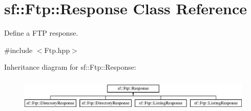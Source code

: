 \hypertarget{classsf_1_1_ftp_1_1_response}{\section{sf\-:\-:Ftp\-:\-:Response Class Reference}
\label{classsf_1_1_ftp_1_1_response}
}


Define a F\-T\-P response.  




{\ttfamily \#include $<$Ftp.\-hpp$>$}

Inheritance diagram for sf\-:\-:Ftp\-:\-:Response\-:\begin{figure}[H]
\begin{center}
\leavevmode
\includegraphics[height=1.666667cm]{classsf_1_1_ftp_1_1_response}
\end{center}
\end{figure}
